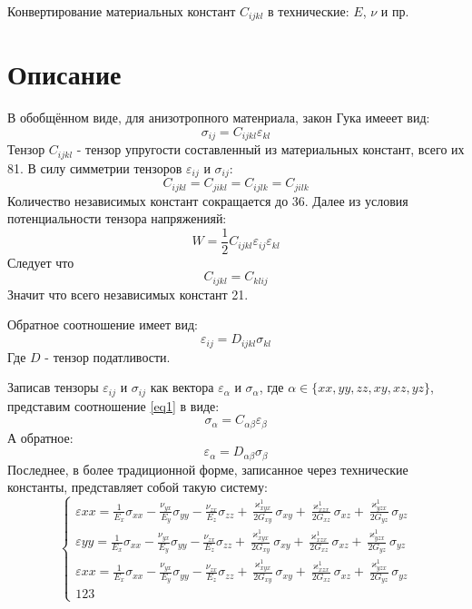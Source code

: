 \documentclass[a4paper,12pt]{article}
\begin{document}
{~}\bigskip
\begin{center}
    \Huge{Конвертирование материальных констант $C_{ijkl}$ в технические: $E$, $\nu$ и пр.}
\end{center}

\section{Описание}
В обобщённом виде, для анизотропного матенриала, закон Гука имееет вид:
\begin{equation}
    \label{eq1}
    \sigma_{ij} = C_{ijkl}\varepsilon_{kl}
\end{equation}
Тензор $C_{ijkl}$ - тензор упругости составленный из материальных констант, всего их 81.
В силу симметрии тензоров $\varepsilon_{ij}$ и $\sigma_{ij}$:
$$
C_{ijkl} = C_{jikl} = C_{ijlk} = C_{jilk} 
$$
Количество независимых констант сокращается до 36. Далее из условия потенциальности тензора напряженияй:
$$
W=\frac{1}{2}C_{ijkl}\varepsilon_{ij}\varepsilon_{kl}
$$
Следует что 
$$
C_{ijkl} = C_{klij}
$$
Значит что всего независимых констант 21.

Обратное соотношение имеет вид:
$$
\varepsilon_{ij} = D_{ijkl}\sigma_{kl}
$$
Где $D$ - тензор податливости.

Записав тензоры $\varepsilon_{ij}$ и $\sigma_{ij}$ как вектора $\varepsilon_{\alpha}$ и $\sigma_{\alpha}$, где $\alpha \in \{xx, yy, zz, xy, xz, yz\}$,
представим соотношение \ref{eq1} в виде:
$$
    \sigma_{\alpha} = C_{\alpha\beta}\varepsilon_{\beta}
$$
А обратное:
$$
    \varepsilon_{\alpha} = D_{\alpha\beta}\sigma_{\beta}
$$
Последнее, в более традиционной форме, записанное через технические константы, представляет собой такую систему:
\begin{equation*}
    \begin{cases}
        \varepsilon{xx} = \frac{1}{E_x}\sigma_{xx} - \frac{\nu_{yx}}{E_y}\sigma_{yy} - \frac{\nu_{zx}}{E_z}\sigma_{zz} + \frac{\varkappa^1_{xyx}}{2G_{xy}}\sigma_{xy} + \frac{\varkappa^1_{xzx}}{2G_{xz}}\sigma_{xz} + \frac{\varkappa^1_{yzx}}{2G_{yz}}\sigma_{yz}\\
        \varepsilon{yy} = \frac{1}{E_x}\sigma_{xx} - \frac{\nu_{yx}}{E_y}\sigma_{yy} - \frac{\nu_{zx}}{E_z}\sigma_{zz} + \frac{\varkappa^1_{xyx}}{2G_{xy}}\sigma_{xy} + \frac{\varkappa^1_{xzx}}{2G_{xz}}\sigma_{xz} + \frac{\varkappa^1_{yzx}}{2G_{yz}}\sigma_{yz}\\
        \varepsilon{xx} = \frac{1}{E_x}\sigma_{xx} - \frac{\nu_{yx}}{E_y}\sigma_{yy} - \frac{\nu_{zx}}{E_z}\sigma_{zz} + \frac{\varkappa^1_{xyx}}{2G_{xy}}\sigma_{xy} + \frac{\varkappa^1_{xzx}}{2G_{xz}}\sigma_{xz} + \frac{\varkappa^1_{yzx}}{2G_{yz}}\sigma_{yz}\\
        123
    \end{cases}
\end{equation*}
\end{document}
